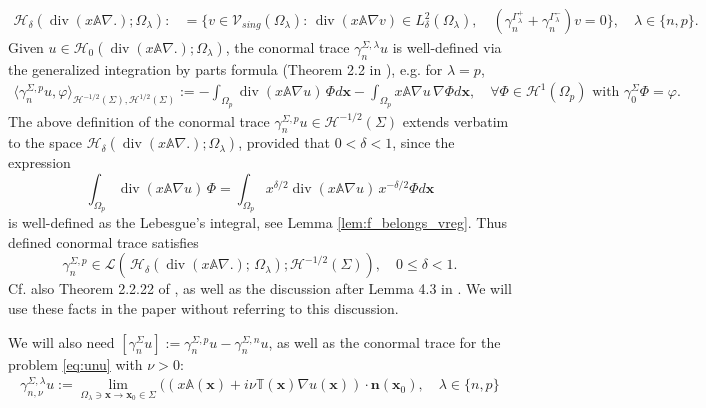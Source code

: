 \documentclass[report]{elsarticle}
\numberwithin{theorem}{section}
\renewcommand{\vec}[1]{\mathbf{#1}}
\begin{document}
\begin{align}
	\label{eq:hdelta}
	\mathcal{H}_{\delta}(\operatorname{div}(x\mathbb{A}\nabla.); \Omega_{\lambda}):&=\{v\in \mathcal{V}_{sing}(\Omega_{\lambda}): \, \operatorname{div}(x\mathbb{A}\nabla v)\in L^2_{\delta}(\Omega_{\lambda}), \quad (\gamma_{n}^{\Gamma^+_{\lambda}}+\gamma_n^{\Gamma^{-}_{\lambda}})v=0\}, \quad \lambda\in \{n,p\}.
\end{align}
Given $u\in \mathcal{H}_0(\operatorname{div}(x\mathbb{A}\nabla.); \Omega_{\lambda})$, the conormal trace  $\gamma_n^{\Sigma,\lambda}u$ is well-defined via the generalized integration by parts formula (Theorem 2.2 in \cite{girault_raviart}), e.g. for $\lambda=p$,
\begin{align*}
	\langle \gamma_n^{\Sigma,p}u, \varphi\rangle_{\mathcal{H}^{-1/2}(\Sigma), \mathcal{H}^{1/2}(\Sigma)}:=-\int_{\Omega_p}\operatorname{div}(x\mathbb{A}\nabla u)\, {\Phi}d\vec{x}-\int_{\Omega_p}x\mathbb{A}\nabla u\, {\nabla \Phi}d\vec{x}, \quad \forall \Phi\in \mathcal{H}^1(\Omega_p) \text{ with }\gamma_0^{\Sigma}\Phi=\varphi.
\end{align*}	
The above definition of the conormal trace $\gamma_n^{\Sigma,p}u\in \mathcal{H}^{-1/2}(\Sigma)$ extends verbatim to the space   $\mathcal{H}_{\delta}(\operatorname{div}(x\mathbb{A}\nabla .); \Omega_{\lambda})$, provided that  $0<\delta<1$, since the expression 
$$\int_{\Omega_p}\operatorname{div}(x\mathbb{A}\nabla u)\, {\Phi}=\int_{\Omega_p}x^{\delta/2}\operatorname{div}(x\mathbb{A}\nabla u)\, x^{-\delta/2}{\Phi}d\vec{x}$$ is well-defined as the Lebesgue's integral, see Lemma \ref{lem:f_belongs_vreg}. Thus defined conormal trace satisfies $$\gamma_n^{\Sigma,p}\in \mathcal{L}(\,\mathcal{H}_{\delta}(\operatorname{div}(x\mathbb{A}\nabla.); \,\Omega_{\lambda}); \mathcal{H}^{-1/2}(\Sigma)), \quad 0\leq\delta<1.$$
Cf. also Theorem 2.2.22 of \cite{ciarlet_book}, as well as the discussion after Lemma 4.3 in \cite{mclean}. We will use these facts in the paper without referring to this discussion. 


We will also need  $[\gamma_n^{\Sigma}u]:=\gamma_n^{\Sigma,p}u-\gamma_n^{\Sigma,n}u$, as well as the conormal trace for the problem \eqref{eq:unu} with $\nu>0$: 
\begin{align*}
	\gamma_{n,\nu}^{\Sigma,\lambda}u:=\lim\limits_{\Omega_{\lambda}\ni \vec{x}\rightarrow \vec{x}_0\in \Sigma}(({x}\mathbb{A}(\vec{x})+i\nu\mathbb{T}(\vec{x})\nabla u(\vec{x}))\cdot \vec{n}(\vec{x}_0), \quad\lambda\in \{n,p\}
\end{align*}
\end{document}
